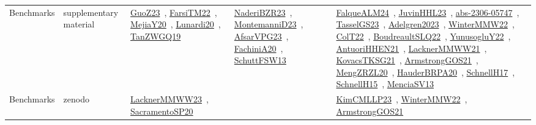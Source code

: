 {\begin{longtable}{lp{3cm}>{\raggedright\arraybackslash}p{6cm}>{\raggedright\arraybackslash}p{6cm}>{\raggedright\arraybackslash}p{8cm}}
\index{supplementary material}\index{Benchmarks!supplementary material}Benchmarks & supplementary material & \href{../works/GuoZ23.pdf}{GuoZ23}~\cite{GuoZ23}, \href{../works/FarsiTM22.pdf}{FarsiTM22}~\cite{FarsiTM22}, \href{../works/MejiaY20.pdf}{MejiaY20}~\cite{MejiaY20}, \href{../works/Lunardi20.pdf}{Lunardi20}~\cite{Lunardi20}, \href{../works/TanZWGQ19.pdf}{TanZWGQ19}~\cite{TanZWGQ19} & \href{../works/NaderiBZR23.pdf}{NaderiBZR23}~\cite{NaderiBZR23}, \href{../works/MontemanniD23.pdf}{MontemanniD23}~\cite{MontemanniD23}, \href{../works/AfsarVPG23.pdf}{AfsarVPG23}~\cite{AfsarVPG23}, \href{../works/FachiniA20.pdf}{FachiniA20}~\cite{FachiniA20}, \href{../works/SchuttFSW13.pdf}{SchuttFSW13}~\cite{SchuttFSW13} & \href{../works/FalqueALM24.pdf}{FalqueALM24}~\cite{FalqueALM24}, \href{../works/JuvinHHL23.pdf}{JuvinHHL23}~\cite{JuvinHHL23}, \href{../works/abs-2306-05747.pdf}{abs-2306-05747}~\cite{abs-2306-05747}, \href{../works/TasselGS23.pdf}{TasselGS23}~\cite{TasselGS23}, \href{../works/Adelgren2023.pdf}{Adelgren2023}~\cite{Adelgren2023}, \href{../works/WinterMMW22.pdf}{WinterMMW22}~\cite{WinterMMW22}, \href{../works/ColT22.pdf}{ColT22}~\cite{ColT22}, \href{../works/BoudreaultSLQ22.pdf}{BoudreaultSLQ22}~\cite{BoudreaultSLQ22}, \href{../works/YunusogluY22.pdf}{YunusogluY22}~\cite{YunusogluY22}, \href{../works/AntuoriHHEN21.pdf}{AntuoriHHEN21}~\cite{AntuoriHHEN21}, \href{../works/LacknerMMWW21.pdf}{LacknerMMWW21}~\cite{LacknerMMWW21}, \href{../works/KovacsTKSG21.pdf}{KovacsTKSG21}~\cite{KovacsTKSG21}, \href{../works/ArmstrongGOS21.pdf}{ArmstrongGOS21}~\cite{ArmstrongGOS21}, \href{../works/MengZRZL20.pdf}{MengZRZL20}~\cite{MengZRZL20}, \href{../works/HauderBRPA20.pdf}{HauderBRPA20}~\cite{HauderBRPA20}, \href{../works/SchnellH17.pdf}{SchnellH17}~\cite{SchnellH17}, \href{../works/SchnellH15.pdf}{SchnellH15}~\cite{SchnellH15}, \href{../works/MenciaSV13.pdf}{MenciaSV13}~\cite{MenciaSV13}\\
\index{zenodo}\index{Benchmarks!zenodo}Benchmarks & zenodo & \href{../works/LacknerMMWW23.pdf}{LacknerMMWW23}~\cite{LacknerMMWW23}, \href{../works/SacramentoSP20.pdf}{SacramentoSP20}~\cite{SacramentoSP20} &  & \href{../works/KimCMLLP23.pdf}{KimCMLLP23}~\cite{KimCMLLP23}, \href{../works/WinterMMW22.pdf}{WinterMMW22}~\cite{WinterMMW22}, \href{../works/ArmstrongGOS21.pdf}{ArmstrongGOS21}~\cite{ArmstrongGOS21}\\
\end{longtable}
}

